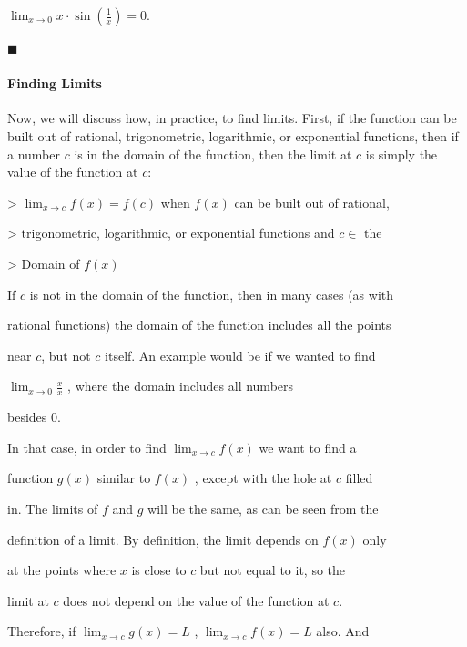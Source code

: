 $\lim_{x\to0}x\cdot\sin\left(\tfrac{1}{x}\right)=0.$



$\blacksquare$






\paragraph{Finding Limits}



Now, we will discuss how, in practice, to find limits. First, if the function can be built out of rational, trigonometric, logarithmic, or exponential functions, then if a number $c$ is in the domain of the function, then the limit at $c$ is simply the value of the function at $c$:



> $\lim_{x \to c} f(x)=f(c)$ when $f(x)$ can be built out of rational,

> trigonometric, logarithmic, or exponential functions and $c \in$ the

> Domain of $f(x)$



If $c$ is not in the domain of the function, then in many cases (as with

rational functions) the domain of the function includes all the points

near $c$, but not $c$ itself. An example would be if we wanted to find

$\lim_{x\to0}\frac{x}{x}$ , where the domain includes all numbers

besides 0.



In that case, in order to find $\lim_{x\to c}f(x)$ we want to find a

function $g(x)$ similar to $f(x)$ , except with the hole at $c$ filled

in. The limits of $f$ and $g$ will be the same, as can be seen from the

definition of a limit. By definition, the limit depends on $f(x)$ only

at the points where $x$ is close to $c$ but not equal to it, so the

limit at $c$ does not depend on the value of the function at $c$.

Therefore, if $\lim_{x\to c}g(x)=L$ , $\lim_{x\to c}f(x)=L$ also. And

